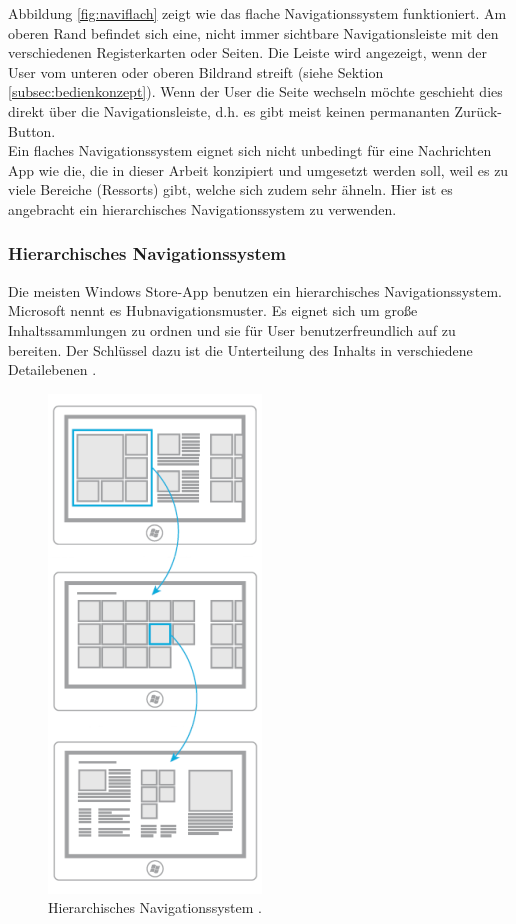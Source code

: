\documentclass[12pt,a4paper,bibtotoc,abstracton]{scrartcl}
\begin{document}
Abbildung \ref{fig:naviflach} zeigt wie das flache Navigationssystem funktioniert. Am oberen Rand befindet sich eine, nicht immer sichtbare Navigationsleiste mit den verschiedenen Registerkarten oder Seiten. Die Leiste wird angezeigt, wenn der User vom unteren oder oberen Bildrand streift (siehe Sektion \ref{subsec:bedienkonzept}). Wenn der User die Seite wechseln möchte geschieht dies  direkt über die Navigationsleiste, d.h. es gibt meist keinen permananten Zurück-Button. \\
Ein flaches Navigationssystem eignet sich nicht unbedingt für eine Nachrichten App wie die, die in dieser Arbeit konzipiert und umgesetzt werden soll, weil es zu viele Bereiche (Ressorts) gibt, welche sich zudem sehr ähneln. Hier ist es angebracht ein hierarchisches Navigationssystem zu verwenden.    



\subsubsection{Hierarchisches Navigationssystem}
\label{subsubsec:hierachischessystem}
Die meisten Windows Store-App benutzen ein hierarchisches Navigationssystem. Microsoft nennt es Hubnavigationsmuster. Es eignet sich um große Inhaltssammlungen zu ordnen und sie für User benutzerfreundlich auf zu bereiten. Der Schlüssel dazu ist die Unterteilung des Inhalts in verschiedene Detailebenen \citep{MicrosoftNavidesign2013}.

\begin{figure}[h]	
	\centering
	\includegraphics[scale=1]{Bilder/Abbildungen/ms_navigation_hierarchie} 
	\caption{Hierarchisches Navigationssystem \protect\citep{MicrosoftNavidesign2013}.}
	\label{fig:navihierarchisch}
\end{figure}
\end{document}
